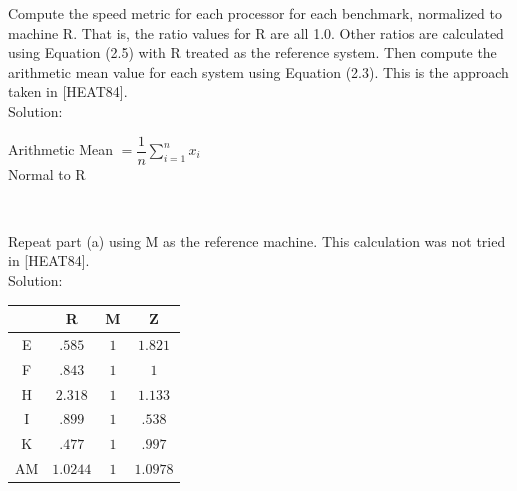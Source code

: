 \documentclass[12pt,largemargins]{homework}
\begin{document}
\begin{alphaparts}
\item
Compute the speed metric for each processor for each benchmark, normalized to
machine R. That is, the ratio values for R are all 1.0. Other ratios are calculated
using Equation (2.5) with R treated as the reference system. Then compute the
arithmetic mean value for each system using Equation (2.3). This is the approach
taken in [HEAT84].\\
Solution: 
\begin{center}
Arithmetic Mean $= \dfrac{1}{n} \sum_{i=1}^n x_i$ \\
Normal to R\\
\begin{center}
\end{center}
\noindent{}\\
\end{center}
\item
Repeat part (a) using M as the reference machine. This calculation was not tried in
[HEAT84].\\
Solution:\\
\begin{center}

\begin{tabular}{|c|c|c|c|}
	\hline
	& R & M & Z\\
	\hline
	E & $.585$ & $1$ & $1.821$\\
	\hline
	F & $.843$ & $1$ & $1$\\
	\hline
	H & $2.318$ & $1$ & $1.133$\\
	\hline
	I & $.899$ & $1$ & $.538$ \\
	\hline
	K & $.477$ & $1$ & $.997$\\
	\hline 
	AM & $1.0244$ & $1$ &$1.0978$\\
	\hline
\end{tabular}\\


\end{center}
\end{alphaparts}
\end{document}

